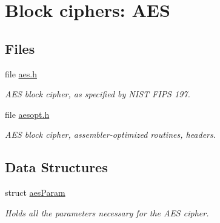 \hypertarget{group__BC__aes__m}{
\section{Block ciphers: AES}
\label{group__BC__aes__m}
}
\subsection*{Files}
\begin{CompactItemize}
\item 
file \hyperlink{aes_8h}{aes.h}
\begin{CompactList}\small\item\em AES block cipher, as specified by NIST FIPS 197. \item\end{CompactList}

\item 
file \hyperlink{aesopt_8h}{aesopt.h}
\begin{CompactList}\small\item\em AES block cipher, assembler-optimized routines, headers. \item\end{CompactList}

\end{CompactItemize}
\subsection*{Data Structures}
\begin{CompactItemize}
\item 
struct \hyperlink{structaesParam}{aes\-Param}
\begin{CompactList}\small\item\em Holds all the parameters necessary for the AES cipher. \item\end{CompactList}\end{CompactItemize}

